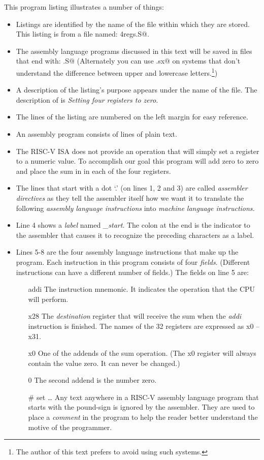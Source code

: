 This program listing illustrates a number of things: 
\begin{itemize}
\item Listings are identified by the name of the file within which
	they are stored.  This listing is from a file named: \verb@zero4regs.S@.
\item The assembly language programs discussed in this text will be saved
	in files that end with: \verb@.S@  (Alternately you can use \verb@.sx@ 
	on systems that don't understand the difference between upper and 
	lowercase letters.\footnote{The author of this text prefers to avoid
	using such systems.})
\item A description of the listing's purpose appears under the name of the
	file.  The description of  is 
	{\em Setting four registers to zero.}
\item The lines of the listing are numbered on the left margin for
	easy reference.
\item An assembly program consists of lines of plain text.
\item The RISC-V ISA does not provide an operation that will simply 
	set a register to a numeric value.  To accomplish our goal this
	program will add zero to zero and place the sum in in each of the
	four registers.
\item The lines that start with a dot `.' (on lines 1, 2 and 3) are 
	called {\em assembler directives} as they tell the assembler itself
	how we want it to translate the following {\em assembly language instructions} 
	into {\em machine language instructions.}  
\item Line 4 shows a {\em label} named {\em \_start}.  The colon
	at the end is the indicator to the assembler that causes it to
	recognize the preceding characters as a label.
\item Lines 5-8 are the four assembly language instructions that
	make up the program.  Each instruction in this program
	consists of four {\em fields}.  (Different instructions can have 
	a different number of fields.)  The fields on line 5 are:

	\begin{itemize}
	\item [addi] The instruction mnemonic.  It indicates the operation 
		that the CPU will perform.
	\item [x28] The {\em destination} register that will receive the 
		sum when the {\em addi} instruction is finished.  The names of
		the 32 registers are expressed as x0 -- x31.
	\item [x0] One of the addends of the sum operation.  (The x0 register
		will always contain the value zero.  It can never be changed.)
	\item [0] The second addend is the number zero.
		\item [\# set \ldots] Any text anywhere in a RISC-V assembly language
	program that starts with the pound-sign is ignored by the assembler.
			They are used to place a {\em comment} in the program to help
	the reader better understand the motive of the programmer.
	\end{itemize}
\end{itemize}


